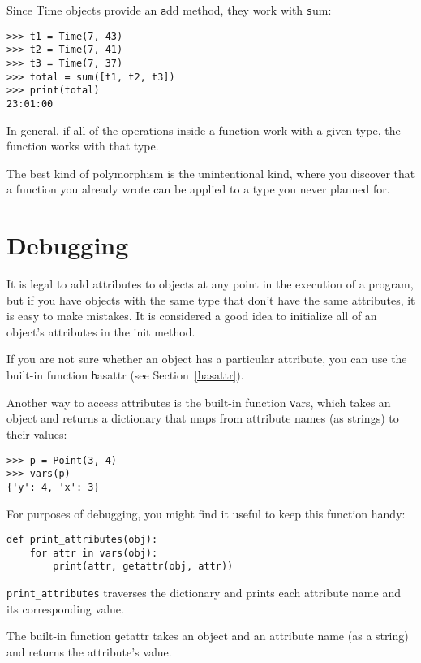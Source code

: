\documentclass[
DIV=11,
fontsize=13,
twoside,
headinclude=false,
titlepage=firstiscover,
abstract=true,
headsepline=true,
footsepline=true,
chapterprefix=true, %
headings=big,
bibliography=totoc,%
captions=tableheading
]{scrbook}
\theoremstyle{definition}
\begin{document}
Since Time objects provide an {\texttt add} method, they work
with {\texttt sum}:

\begin{lstlisting}
>>> t1 = Time(7, 43)
>>> t2 = Time(7, 41)
>>> t3 = Time(7, 37)
>>> total = sum([t1, t2, t3])
>>> print(total)
23:01:00
\end{lstlisting}
%
In general, if all of the operations inside a function 
work with a given type, the function works with that type.

The best kind of polymorphism is the unintentional kind, where
you discover that a function you already wrote can be
applied to a type you never planned for.


\section{Debugging}

It is legal to add attributes to objects at any point in the execution
of a program, but if you have objects with the same type that don't
have the same attributes, it is easy to make mistakes.
It is considered a good idea to
initialize all of an object's attributes in the init method.

If you are not sure whether an object has a particular attribute, you
can use the built-in function {\texttt hasattr} (see Section~\ref{hasattr}).

Another way to access attributes is the built-in function {\texttt vars},
which takes an object and returns a dictionary that maps from
attribute names (as strings) to their values:

\begin{lstlisting}
>>> p = Point(3, 4)
>>> vars(p)
{'y': 4, 'x': 3}
\end{lstlisting}
%
For purposes of debugging, you might find it useful to keep this
function handy:

\begin{lstlisting}
def print_attributes(obj):
    for attr in vars(obj):
        print(attr, getattr(obj, attr))
\end{lstlisting}
%
\verb"print_attributes" traverses the dictionary
and prints each attribute name and its corresponding value.

The built-in function {\texttt getattr} takes an object and an attribute
name (as a string) and returns the attribute's value.
\end{document}
